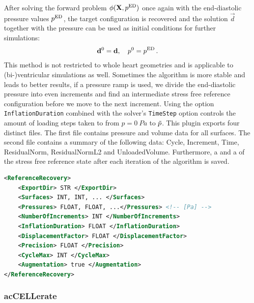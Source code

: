 After solving the forward problem $\phi(\vec X, \p{}^\mathrm{ED})$ once again with the end-diastolic pressure values $p_\mathrm{}^\mathrm{ED}$, the target configuration is recovered and the solution $\vec d$ together with the pressure can be used as initial conditions for further simulations:
\begin{equation*}
    \vec d^0 = \vec d \qc \p{}^0 = \p{}^\mathrm{ED} \,.
\end{equation*}
This method is not restricted to whole heart geometries and is applicable to (bi-)ventricular simulations as well.
Sometimes the algorithm is more stable and leads to better results, if a pressure ramp is used, \ie we divide the end-diastolic pressure into even increments and find an intermediate stress free reference configuration before we move to the next increment.
Using the option \verb|InflationDuration| combined with the solver's \verb|TimeStep| option controls the amount of loading steps taken to from $p = \SI{0}{Pa}$ to $\Tilde{p}$.
This plugin exports four distinct files.
The first file contains pressure and volume data for all surfaces.
The second file contains a summary of the following data: Cycle, Increment, Time, ResidualNorm, ResidualNormL2 and UnloadedVolume.
Furthermore, a  and a  of the stress free reference state after each iteration of the algorithm is saved.

\begin{lstlisting}[language=XML,caption=.xml settings for the ReferenceRecovery plugin]
<ReferenceRecovery>
    <ExportDir> STR </ExportDir>
    <Surfaces> INT, INT, ... </Surfaces>
    <Pressures> FLOAT, FLOAT, ...</Pressures> <!-- [Pa] -->
    <NumberOfIncrements> INT </NumberOfIncrements>
    <InflationDuration> FLOAT </InflationDuration>
    <DisplacementFactor> FLOAT </DisplacementFactor>
    <Precision> FLOAT </Precision>
    <CycleMax> INT </CycleMax>
    <Augmentation> true </Augmentation>
</ReferenceRecovery>
\end{lstlisting}

\subsubsection{acCELLerate}
\label{plugin:acCELLerate}

